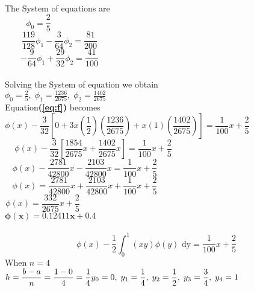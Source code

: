 \documentclass[a4paper,12pt]{report}
\newcommand{\sps}{\\[0.2cm]}
\newcommand{\refn}[1]{\textbf{(\ref{#1})}}
\begin{document}
	\\[-0.7cm]The System of equations are\\
	\begin{equation}
		\phi_0=\frac{2}{5} \tag{i}\quad\quad\quad\quad\quad\quad\quad\quad\quad\quad\quad\quad\quad\quad\quad\quad\quad\quad\quad\quad\quad\quad\quad\quad\quad\quad\quad\quad
	\end{equation}
	\begin{equation}
		\frac{119}{128}\phi_1 - \frac{3}{64}\phi_2 = \frac{81}{200}\quad\quad\quad\quad\quad\quad\quad\quad\quad\quad\quad\quad\quad\quad\quad\quad\quad\quad\quad\quad\quad\quad\quad \tag{ii}
	\end{equation}
	\begin{equation}
		-\frac{9}{64}\phi_1 + \frac{29}{32}\phi_2 = \frac{41}{100}\quad\quad\quad\quad\quad\quad\quad\quad\quad\quad\quad\quad\quad\quad\quad\quad\quad\quad\quad\quad\quad\quad\quad \tag{iii}
	\end{equation}
	\\[-0.7cm]Solving the System of equation we obtain\\
	$\displaystyle \phi_0=\frac{2}{5}, \; \phi_1=\frac{1236}{2675}, \; \phi_2=\frac{1402}{2675} $\sps
	Equation\refn{eq:f} becomes
	$$
		\phi(x) - \frac{3}{32} \left[0 + 3x \left(\frac{1}{2}\right)\left(\frac{1236}{2675}\right) + x(1)\left(\frac{1402}{2675}\right)\right] = \frac{1}{100}x + \frac{2}{5}\quad\quad\quad\quad\quad\quad\quad
	$$
	$$
		\phi(x) - \frac{3}{32} \left[\frac{1854}{2675}x + \frac{1402}{2675}x\right] = \frac{1}{100}x + \frac{2}{5}\quad\quad\quad\quad\quad\quad\quad\quad\quad\quad\quad\quad\quad\quad\quad
	$$
	$$
		\phi(x) - \frac{2781}{42800}x - \frac{2103}{42800}x = \frac{1}{100}x + \frac{2}{5}\quad\quad\quad\quad\quad\quad\quad\quad\quad\quad\quad\quad\quad\quad\quad\quad\quad
	$$
	$$
		\phi(x) = \frac{2781}{42800}x + \frac{2103}{42800}x + \frac{1}{100}x + \frac{2}{5}\quad\quad\quad\quad\quad\quad\quad\quad\quad\quad\quad\quad\quad\quad\quad\quad\quad
	$$
	$$
		\phi(x) = \frac{332}{2675}x + \frac{2}{5}\quad\quad\quad\quad\quad\quad\quad\quad\quad\quad\quad\quad\quad\quad\quad\quad\quad\quad\quad\quad\quad\quad\quad\quad\quad\quad\quad
	$$
	$$
		\mathbf{\phi(x) = 0.12411x +0.4}\quad\quad\quad\quad\quad\quad\quad\quad\quad\quad\quad\quad\quad\quad\quad\quad\quad\quad\quad\quad\quad\quad\quad\quad\quad\quad\quad
	$$\\
	$$
		\phi(x) - \frac{1}{2} \int_0^1 (xy)\phi(y)\text{ dy} = \frac{1}{100}x + \frac{2}{5}
	$$
	When $n=4$\sps
	$\displaystyle h = \frac{b-a}{n} = \frac{1-0}{4} = \frac{1}{4}\\[0.3cm] y_0=0, \; y_1=\frac{1}{4},\; y_2=\frac{1}{2},\; y_3=\frac{3}{4},\; y_4=1$\sps
	
\end{document}
